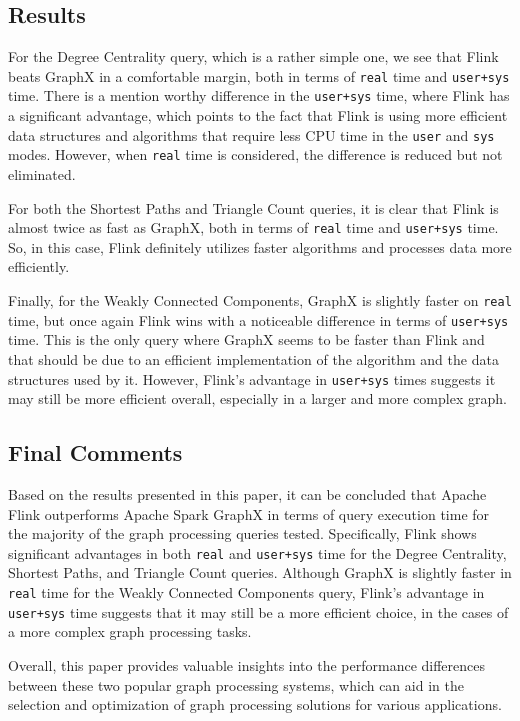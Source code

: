 \documentclass[conference]{IEEEtran}
\begin{document}
\subsection{Results}

For the Degree Centrality query, which is a rather simple one, we see that Flink beats GraphX in a comfortable margin, both in terms of \verb|real| time and \verb|user+sys| time. There is a mention worthy difference in the \verb|user+sys| time, where Flink has a significant advantage, which points to the fact that Flink is using more efficient data structures and algorithms that require less CPU time in the \verb|user| and \verb|sys| modes. However, when \verb|real| time is considered, the difference is reduced but not eliminated.

For both the Shortest Paths and Triangle Count queries, it is clear that Flink is almost twice as fast as GraphX, both in terms of \verb|real| time and \verb|user+sys| time. So, in this case, Flink definitely utilizes faster algorithms and processes data more efficiently.

Finally, for the Weakly Connected Components, GraphX is slightly faster on \verb|real| time, but once again Flink wins with a noticeable difference in terms of \verb|user+sys| time. This is the only query where GraphX seems to be faster than Flink and that should be due to an efficient implementation of the algorithm and the data structures used by it. However, Flink's advantage in \verb|user+sys| times suggests it may still be more efficient overall, especially in a larger and more complex graph.

\subsection{Final Comments}

Based on the results presented in this paper, it can be concluded that Apache Flink outperforms Apache Spark GraphX in terms of query execution time for the majority of the graph processing queries tested. Specifically, Flink shows significant advantages in both \verb|real| and \verb|user+sys| time for the Degree Centrality, Shortest Paths, and Triangle Count queries. Although GraphX is slightly faster in \verb|real| time for the Weakly Connected Components query, Flink's advantage in \verb|user+sys| time suggests that it may still be a more efficient choice, in the cases of a more complex graph processing tasks. 

Overall, this paper provides valuable insights into the performance differences between these two popular graph processing systems, which can aid in the selection and optimization of graph processing solutions for various applications.
\end{document}
